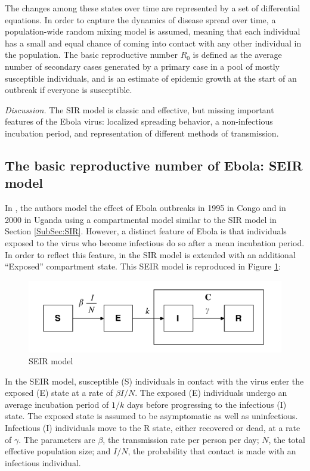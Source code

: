 \documentclass[10pt, journal,onecolumn]{IEEEtran}
\begin{document}
The changes among these states over time are represented by a set of differential equations. In
order to capture the dynamics of disease spread over time, a population-wide random mixing model is
assumed, meaning that each individual has a small and equal chance of coming into contact with
any other individual in the population. The basic reproductive number $R_0$
is defined as the average number of secondary cases generated by a primary case in a pool of mostly
susceptible individuals, and is an estimate of epidemic growth at the start of an outbreak if
everyone is susceptible.

\textit{Discussion.} The SIR model is classic and effective, but missing important features
of the Ebola virus: localized spreading behavior, a non-infectious incubation period, and
representation of different methods of transmission.

\subsection{\textbf{The basic reproductive number of Ebola: SEIR model \citep{chowell2004basic}}}

In \citep{chowell2004basic}, the authors model the effect of Ebola outbreaks in 1995 in Congo and in
2000 in Uganda using a compartmental model similar to the SIR model in Section \ref{SubSec:SIR}. However, a
distinct feature of Ebola is that individuals exposed to the virus who become infectious do so
after a mean incubation period. In order to reflect this feature, in the SIR model is extended with
an additional ``Exposed'' compartment state. This SEIR model is reproduced in
Figure \ref{fig:SEIR_model}:

\begin{figure}[h!]
\captionsetup{justification=centering}
\includegraphics[scale=0.4]{seir_model_fig}
\centering\caption{SEIR model}
\label{fig:SEIR_model}
\end{figure}

In the SEIR model, susceptible (S) individuals in contact with the virus enter the exposed (E) state
at a rate of $\beta I / N$.
The exposed (E) individuals undergo an average incubation period of $1/k$ days before progressing to
the infectious (I) state. The exposed state is assumed to be asymptomatic as well as uninfectious.
Infectious (I) individuals move to the R state, either recovered or dead, at a rate of $\gamma$.
 The parameters are $\beta$, the transmission rate per person per day;
$N$, the total effective population size; and $I/N$, the probability that contact is made with
an infectious individual.
\end{document}
